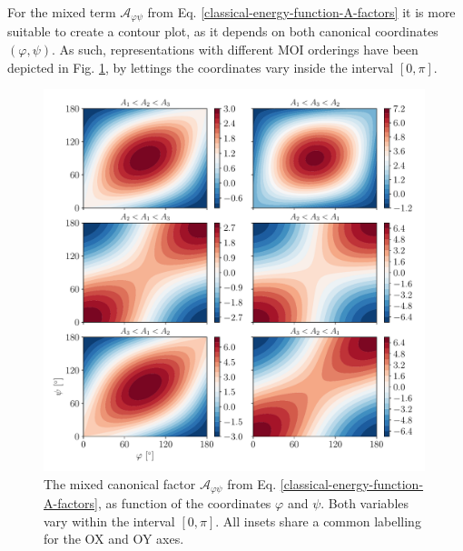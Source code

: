 For the mixed term $\mathcal{A}_{\varphi\psi}$ from Eq. \ref{classical-energy-function-A-factors} it is more suitable to create a contour plot, as it depends on both canonical coordinates $(\varphi,\psi)$. As such, representations with different MOI orderings have been depicted in Fig. \ref{fig-A-mixed-canonical}, by lettings the coordinates vary inside the interval $[0,\pi]$.
\begin{figure}
    \centering
    \includegraphics[width=0.99\textwidth]{Chapters/Figures/A_mixed.pdf}
    \caption{The mixed canonical factor $\mathcal{A}_{\varphi\psi}$ from Eq. \ref{classical-energy-function-A-factors}, as function of the coordinates $\varphi$ and $\psi$. Both variables vary within the interval $[0,\pi]$. All insets share a common labelling for the OX and OY axes.}
    \label{fig-A-mixed-canonical}
\end{figure}

